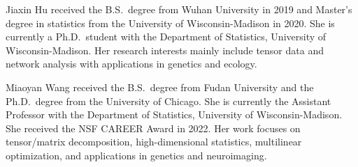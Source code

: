 \documentclass[journal]{IEEEtran}
\theoremstyle{definition}
\theoremstyle{definition}
\begin{document}

\begin{IEEEbiographynophoto}{Jiaxin Hu} received the B.S.\ degree from Wuhan University in 2019 and Master's degree in statistics from the University of Wisconsin-Madison in 2020. She is currently a Ph.D.\ student with the Department of Statistics, University of Wisconsin-Madison. Her research interests mainly include tensor data and network analysis with applications in genetics and ecology.
\end{IEEEbiographynophoto}


\begin{IEEEbiographynophoto}{Miaoyan Wang} received the B.S.\ degree from Fudan University and the Ph.D.\ degree from the University of Chicago. She is currently the Assistant Professor with the Department of Statistics, University of Wisconsin-Madison. She received the NSF CAREER Award in 2022. Her work focuses on tensor/matrix decomposition, high-dimensional statistics, multilinear optimization, and applications in genetics and neuroimaging. 
\end{IEEEbiographynophoto}






\end{document}
